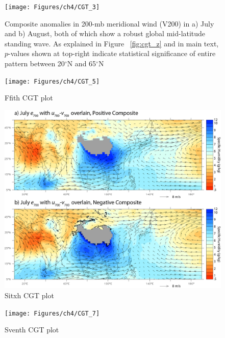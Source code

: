 \begin{figure}
\centering
\noindent\texttt{[image: Figures/ch4/CGT\_3]}
\caption{Composite anomalies in 200-mb meridional wind (V200) in a) July and b) August, both of which show a robust global mid-latitude standing wave. As explained in Figure ~\ref{fig:cgt_z} and in main text, $p$-values shown at top-right indicate statistical significance of entire pattern between 20$^{\circ}$N and 65$^{\circ}$N}
\label{fig:cgt_v}
\end{figure}




\begin{figure}
\centering
\noindent\texttt{[image: Figures/ch4/CGT\_5]}
\caption{Ffith CGT plot}
\label{fig:cgt_dyn}
\end{figure}

\begin{figure}
\centering
\noindent\includegraphics[width=36pc]{Figures/ch4/CGT_6}
\caption{Sitxh CGT plot}
\label{fig:cgt_700}
\end{figure}

\begin{figure}
\centering
\noindent\texttt{[image: Figures/ch4/CGT\_7]}
\caption{Sventh CGT plot}
\label{fig:cgt_500}
\end{figure}


